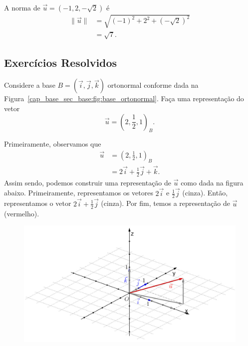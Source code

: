 \begin{ex}
  A norma de $\vec{u} = \left(-1,2,-\sqrt{2}\right)$ é
  \begin{align}
    \|\vec{u}\| &= \sqrt{(-1)^2 + 2^2 + \left(-\sqrt{2}\right)^2}\\
                &= \sqrt{7}.
  \end{align}
\end{ex}

\subsection{Exercícios Resolvidos}

\begin{exeresol}
  Considere a base $B=(\vec{i}, \vec{j}, \vec{k})$ ortonormal conforme dada na Figura~\ref{cap_base_sec_base:fig:base_ortonormal}. Faça uma representação do vetor 
  \begin{equation}
    \vec{u}=\left(2, \frac{1}{2}, 1\right)_B.
  \end{equation}
\end{exeresol}
\begin{resol}
  Primeiramente, observamos que
  \begin{align}
    \vec{u} &= \left(2, \frac{1}{2}, 1\right)_B\\
            &= 2\vec{i} + \frac{1}{2}\vec{j} + \vec{k}.
  \end{align}
  Assim sendo, podemos construir uma representação de $\vec{u}$ como dada na figura abaixo. Primeiramente, representamos os vetores $2\vec{i}$ e $\frac{1}{2}\vec{j}$ (cinza). Então, representamos o vetor $2\vec{i}+\frac{1}{2}\vec{j}$ (cinza). Por fim, temos a representação de $\vec{u}$ (vermelho).
  \begin{figure}[H]
    \centering
    \includegraphics[width=5in]{cap_base/dados/fig_exeresol_base/fig.jpg}
  \end{figure}
\end{resol}

